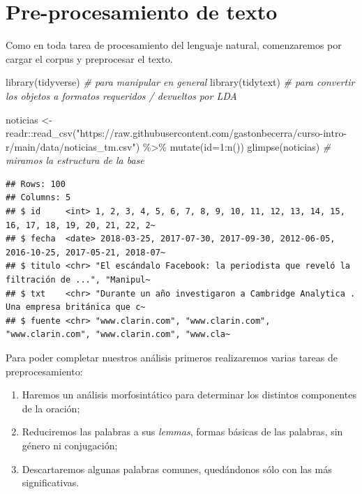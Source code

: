 \documentclass[
]{book}
\newenvironment{Shaded}{\begin{snugshade}}{\end{snugshade}}
\newcommand{\AttributeTok}[1]{\textcolor[rgb]{0.77,0.63,0.00}{#1}}
\newcommand{\CommentTok}[1]{\textcolor[rgb]{0.56,0.35,0.01}{\textit{#1}}}
\newcommand{\DecValTok}[1]{\textcolor[rgb]{0.00,0.00,0.81}{#1}}
\newcommand{\FunctionTok}[1]{\textcolor[rgb]{0.00,0.00,0.00}{#1}}
\newcommand{\NormalTok}[1]{#1}
\newcommand{\OtherTok}[1]{\textcolor[rgb]{0.56,0.35,0.01}{#1}}
\newcommand{\SpecialCharTok}[1]{\textcolor[rgb]{0.00,0.00,0.00}{#1}}
\newcommand{\StringTok}[1]{\textcolor[rgb]{0.31,0.60,0.02}{#1}}
\providecommand{\tightlist}{%
  \setlength{\itemsep}{0pt}\setlength{\parskip}{0pt}}
\begin{document}
\hypertarget{pre-procesamiento-de-texto-1}{%
\section{Pre-procesamiento de texto}\label{pre-procesamiento-de-texto-1}}

Como en toda tarea de procesamiento del lenguaje natural, comenzaremos por cargar el corpus y preprocesar el texto.

\begin{Shaded}
\begin{Highlighting}[]
\FunctionTok{library}\NormalTok{(tidyverse) }\CommentTok{\# para manipular en general}
\FunctionTok{library}\NormalTok{(tidytext) }\CommentTok{\# para convertir los objetos a formatos requeridos / devueltos por LDA}

\NormalTok{noticias }\OtherTok{\textless{}{-}}\NormalTok{ readr}\SpecialCharTok{::}\FunctionTok{read\_csv}\NormalTok{(}\StringTok{"https://raw.githubusercontent.com/gastonbecerra/curso{-}intro{-}r/main/data/noticias\_tm.csv"}\NormalTok{) }\SpecialCharTok{\%\textgreater{}\%}
  \FunctionTok{mutate}\NormalTok{(}\AttributeTok{id=}\DecValTok{1}\SpecialCharTok{:}\FunctionTok{n}\NormalTok{())}
\FunctionTok{glimpse}\NormalTok{(noticias) }\CommentTok{\# miramos la estructura de la base}
\end{Highlighting}
\end{Shaded}

\begin{verbatim}
## Rows: 100
## Columns: 5
## $ id     <int> 1, 2, 3, 4, 5, 6, 7, 8, 9, 10, 11, 12, 13, 14, 15, 16, 17, 18, 19, 20, 21, 22, 2~
## $ fecha  <date> 2018-03-25, 2017-07-30, 2017-09-30, 2012-06-05, 2016-10-25, 2017-05-21, 2018-07~
## $ titulo <chr> "El escándalo Facebook: la periodista que reveló la filtración de ...", "Manipul~
## $ txt    <chr> "Durante un año investigaron a Cambridge Analytica . Una empresa británica que c~
## $ fuente <chr> "www.clarin.com", "www.clarin.com", "www.clarin.com", "www.clarin.com", "www.cla~
\end{verbatim}

Para poder completar nuestros análisis primeros realizaremos varias tareas de preprocesamiento:

\begin{enumerate}
\def\labelenumi{\arabic{enumi}.}
\tightlist
\item
  Haremos un análisis morfosintático para determinar los distintos componentes de la oración;
\item
  Reduciremos las palabras a sus \emph{lemmas}, formas básicas de las palabras, sin género ni conjugación;
\item
  Descartaremos algunas palabras comunes, quedándonos sólo con las más significativas.
\end{enumerate}
\end{document}
